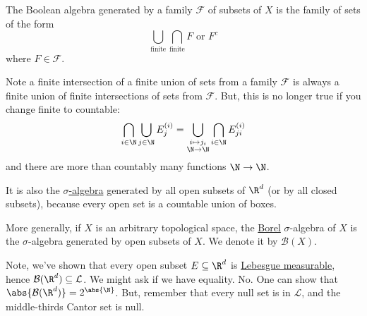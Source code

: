 \documentclass{article}
\newcommand{\1}[1]{\mathbbm{1}_{#1}}
\begin{document}
\begin{remark}
    The Boolean algebra generated by a family $\mathcal{F}$ of subsets of $X$ is the family of sets of the form
    \begin{equation*}
        \bigcup_{\text{finite}} \bigcap_{\text{finite}} F \text{ or } F^c
    \end{equation*}
    where $F \in \mathcal{F}$.
\end{remark}

Note a finite intersection of a finite union of sets from a family $\mathcal{F}$ is always a finite union of finite intersections of sets from $\mathcal{F}$. But, this is no longer true if you change finite to countable:
\begin{equation*}
    \bigcap_{i \in \N} \bigcup_{j \in \N} E_j^{(i)} = \bigcup_{\substack{i \mapsto j_i \\ \N \to \N}} \bigcap_{i \in \N} E_{ji}^{(i)}
\end{equation*}
and there are more than countably many functions $\N \to \N$.


\begin{remark}
    It is also the \hyperlink{def:sigAlg}{$\sigma$-algebra} generated by all open subsets of $\R^d$ (or by all closed subsets), because every open set is a countable union of boxes.

    More generally, if $X$ is an arbitrary topological space, the \hyperlink{def:borelAlg}{Borel} $\sigma$-algebra of $X$ is the $\sigma$-algebra generated by open subsets of $X$. We denote it by $\mathcal{B}(X)$.
\end{remark}

Note, we've shown that every open subset $E \subseteq \R^d$ is \hyperlink{def:lebMAble}{Lebesgue measurable}, hence $\mathcal{B}(\R^d) \subseteq \mathcal{L}$. We might ask if we have equality.
No. One can show that $\abs{\mathcal{B}(\R^d)} = 2^{\abs{\N}}$. But, remember that every null set is in $\mathcal{L}$, and the middle-thirds Cantor set is null.


\end{document}
